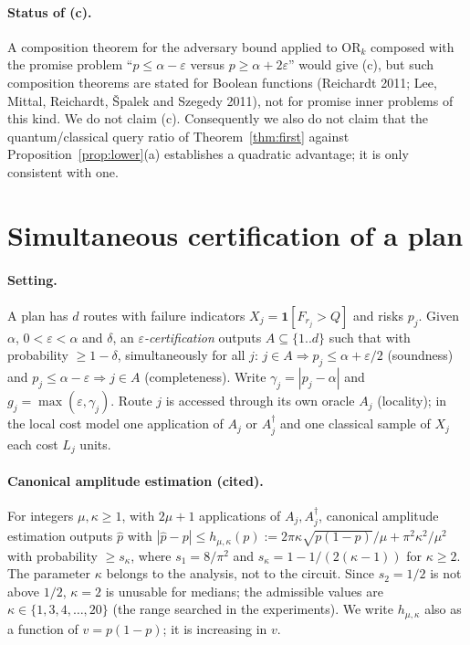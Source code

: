 \paragraph{Status of (c).} A composition theorem for the adversary bound applied to $\mathrm{OR}_k$ composed with the promise problem ``$p\le\alpha-\varepsilon$ versus $p\ge\alpha+2\varepsilon$'' would give (c), but such composition theorems are stated for Boolean functions (Reichardt 2011; Lee, Mittal, Reichardt, \v{S}palek and Szegedy 2011), not for promise inner problems of this kind. We do not claim (c). Consequently we also do not claim that the quantum/classical query ratio of Theorem~\ref{thm:first} against Proposition~\ref{prop:lower}(a) establishes a quadratic advantage; it is only consistent with one.

\section{Simultaneous certification of a plan}\label{app:cert}

\paragraph{Setting.} A plan has $d$ routes with failure indicators $X_j=\mathbf 1[F_{r_j}>Q]$ and risks $p_j$. Given $\alpha$, $0<\varepsilon<\alpha$ and $\delta$, an \emph{$\varepsilon$-certification} outputs $A\subseteq\{1..d\}$ such that with probability $\ge1-\delta$, simultaneously for all $j$: $j\in A\Rightarrow p_j\le\alpha+\varepsilon/2$ (soundness) and $p_j\le\alpha-\varepsilon\Rightarrow j\in A$ (completeness). Write $\gamma_j=|p_j-\alpha|$ and $g_j=\max(\varepsilon,\gamma_j)$. Route $j$ is accessed through its own oracle $A_j$ (locality); in the local cost model one application of $A_j$ or $A_j^\dagger$ and one classical sample of $X_j$ each cost $L_j$ units.

\paragraph{Canonical amplitude estimation (cited).} For integers $\mu,\kappa\ge1$, with $2\mu+1$ applications of $A_j,A_j^\dagger$, canonical amplitude estimation \citep[Thm.~12]{Brassard2002} outputs $\hat p$ with $|\hat p-p|\le h_{\mu,\kappa}(p):=2\pi\kappa\sqrt{p(1-p)}/\mu+\pi^2\kappa^2/\mu^2$ with probability $\ge s_\kappa$, where $s_1=8/\pi^2$ and $s_\kappa=1-1/(2(\kappa-1))$ for $\kappa\ge2$. The parameter $\kappa$ belongs to the analysis, not to the circuit. Since $s_2=1/2$ is not above $1/2$, $\kappa=2$ is unusable for medians; the admissible values are $\kappa\in\{1,3,4,\dots,20\}$ (the range searched in the experiments). We write $h_{\mu,\kappa}$ also as a function of $v=p(1-p)$; it is increasing in $v$.

